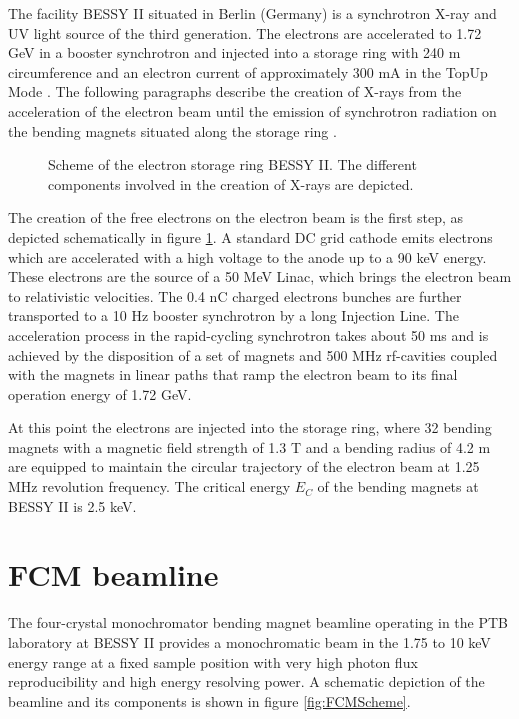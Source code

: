 The facility BESSY II situated in Berlin (Germany) is a synchrotron X-ray and UV light source of the third generation. The electrons are accelerated to 1.72 GeV in a booster synchrotron and injected into a storage ring with 240 m circumference and an electron current of approximately 300 mA in the TopUp Mode \citep{couprie_x_2008}. The following paragraphs describe the creation of X-rays from the acceleration of the electron beam until the emission of synchrotron radiation on the bending magnets situated along the storage ring \citep{bakker_orbit_1998, bakker_status_1999}.

\begin{figure}%
\centering
\def\svgwidth{0.7\linewidth}
{\figfont{9pt}}
\caption[Scheme of the electron storage ring BESSY II.]{Scheme of the electron storage ring BESSY II. The different components involved in the creation of X-rays are depicted.}
\label{fig:BessyScheme}
\end{figure}

The creation of the free electrons on the electron beam is the first step, as depicted schematically in figure \ref{fig:BessyScheme}. A standard DC grid cathode emits electrons which are accelerated with a high voltage to the anode up to a 90 keV energy. These electrons are the source of a 50 MeV Linac, which brings the electron beam to relativistic velocities. The 0.4 nC charged electrons bunches are further transported to a 10 Hz booster synchrotron by a long Injection Line. The acceleration process in the rapid-cycling synchrotron takes about 50 ms and is achieved by the disposition of a set of magnets and 500 MHz rf-cavities coupled with the magnets in linear paths that ramp the electron beam to its final operation energy of 1.72 GeV.

At this point the electrons are injected into the storage ring, where 32 bending magnets with a magnetic field strength of 1.3 T and a bending radius of 4.2 m \citep{klein_elektronenspeicherringe_2014} are equipped to maintain the circular trajectory of the electron beam at 1.25 MHz revolution frequency. The critical energy $E_C$ of the bending magnets at BESSY II is 2.5 keV. 

\section{FCM beamline}
\label{sec:fcm}

The four-crystal monochromator bending magnet beamline operating in the PTB laboratory at BESSY II \citep{krumrey_design_1998, krumrey_high-accuracy_2001} provides a monochromatic beam in the 1.75 to 10 keV energy range at a fixed sample position with very high photon flux reproducibility and high energy resolving power. A schematic depiction of the beamline and its components is shown in figure \ref{fig:FCMScheme}.

